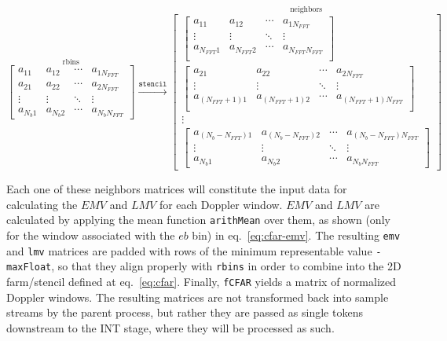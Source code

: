\documentclass[
  a4paper,
]{article}
\begin{document}
\begin{equation}
  \stackrel{\mbox{rbins}}{
  \begin{bmatrix}
  a_{11} & a_{12} & \cdots & a_{1N_{FFT}} \\
  a_{21} & a_{22} & \cdots & a_{2N_{FFT}} \\
  \vdots & \vdots & \ddots & \vdots \\
  a_{N_b1} & a_{N_b2} & \cdots & a_{N_bN_{FFT}}
  \end{bmatrix}}
  \stackrel{\mathtt{stencil}}{\rightarrow}
  \stackrel{\mbox{neighbors}}{
  \begin{bmatrix}
  \begin{bmatrix}
  a_{11} & a_{12} & \cdots & a_{1N_{FFT}} \\
  \vdots & \vdots & \ddots & \vdots \\
  a_{N_{FFT}1} & a_{N_{FFT}2} & \cdots & a_{N_{FFT}N_{FFT}} \\
  \end{bmatrix}\\
  \begin{bmatrix}
  a_{21} & a_{22} & \cdots & a_{2N_{FFT}} \\
  \vdots & \vdots & \ddots & \vdots \\
  a_{(N_{FFT}+1)1} & a_{(N_{FFT}+1)2} & \cdots & a_{(N_{FFT}+1)N_{FFT}} \\
  \end{bmatrix}\\
  \vdots \\
  \begin{bmatrix}
  a_{(N_b-N_{FFT})1} & a_{(N_b-N_{FFT})2} & \cdots & a_{(N_b-N_{FFT})N_{FFT}}\\
  \vdots & \vdots & \ddots & \vdots \\
  a_{N_b1} & a_{N_b2} & \cdots & a_{N_bN_{FFT}}
  \end{bmatrix}
  \end{bmatrix}}
\label{eq:cfar-stencil}\end{equation}

Each one of these neighbors matrices will constitute the input data for
calculating the \(EMV\) and \(LMV\) for each Doppler window. \(EMV\) and
\(LMV\) are calculated by applying the mean function \texttt{arithMean}
over them, as shown (only for the window associated with the \(eb\) bin)
in eq.~\ref{eq:cfar-emv}. The resulting \texttt{emv} and \texttt{lmv}
matrices are padded with rows of the minimum representable value
\texttt{-maxFloat}, so that they align properly with \texttt{rbins} in
order to combine into the 2D farm/stencil defined at eq.~\ref{eq:cfar}.
Finally, \texttt{fCFAR} yields a matrix of normalized Doppler windows.
The resulting matrices are not transformed back into sample streams by
the parent process, but rather they are passed as single tokens
downstream to the INT stage, where they will be processed as such.
\end{document}
